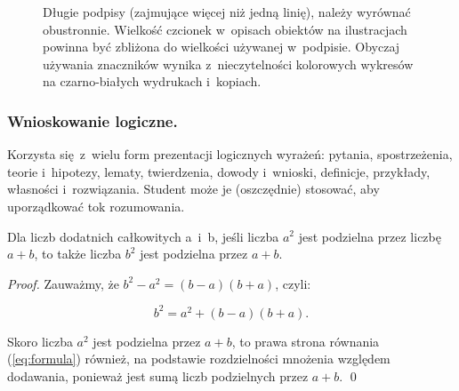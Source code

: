 \begin{figure}[!h]
	\centering
	\caption{Długie podpisy (zajmujące więcej niż jedną linię), należy wyrównać obustronnie. Wielkość czcionek w~opisach obiektów na ilustracjach powinna być zbliżona do wielkości używanej w~podpisie. Obyczaj używania znaczników wynika z~nieczytelności kolorowych wykresów na czarno-białych wydrukach i~kopiach.}
	\label{fig:stats}
	\vspace{-20pt}
\end{figure}

\subsubsection{Wnioskowanie logiczne.}
\label{subsubsec:logic}

Korzysta się z~wielu form prezentacji logicznych wyrażeń: pytania, spostrzeżenia, teorie i~hipotezy, lematy, twierdzenia, dowody i~wnioski, definicje, przykłady, własności i~rozwiązania. Student może je (oszczędnie) stosować, aby uporządkować tok rozumowania.

\begin{claim}
	Dla liczb dodatnich całkowitych a~i~b, jeśli liczba $a^{2}$ jest podzielna przez liczbę $a+b$, to także liczba $b^{2}$ jest podzielna przez $a+b$.
\end{claim}
\begin{proof}
	Zauważmy, że $b^{2} - a^{2} = (b-a)(b+a)$, czyli:

	\begin{equation} \label{eq:formula}
		b^{2} = a^{2} + (b-a)(b+a).
	\end{equation}

	\noindent Skoro liczba $a^{2}$ jest podzielna przez $a+b$, to prawa strona równania (\ref{eq:formula}) również, na podstawie rozdzielności mnożenia względem dodawania, ponieważ jest sumą liczb podzielnych przez $a+b$. \qed
\end{proof}


